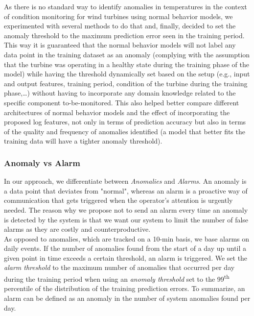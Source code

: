     \par As there is no standard way to identify anomalies in temperatures in the context of condition monitoring for wind turbines using normal behavior models, we experimented 
    with several methods to do that and, finally, decided to set the anomaly threshold to the maximum prediction error seen in the training period. This way it is 
    guaranteed that the normal behavior models will not label any data point in the training dataset as an anomaly (complying with the assumption that the turbine was operating 
    in a healthy state during the training phase of the model) while having the threshold dynamically set based on the setup (e.g., 
    input and output features, training period, condition of the turbine during the training phase,\dots) without having to incorporate any domain knowledge related to the 
    specific component to-be-monitored. This also helped better compare different architectures of normal behavior models and the effect of incorporating the proposed log features, 
    not only in terms of prediction accuracy but also in terms of the quality and frequency of anomalies identified (a model that better fits the training data will have a 
    tighter anomaly threshold).

    \subsubsection{Anomaly vs Alarm}
    \label{subsub:anvsal}
      In our approach, we differentiate between \emph{Anomalies} and \emph{Alarms}. An anomaly is a data point that deviates from "normal", whereas an alarm is a proactive 
      way of communication that gets triggered when the operator's attention is urgently needed. The reason why we propose not to send an alarm every time an anomaly is 
      detected by the system is that we want our system to limit the number of false alarms as they are costly and counterproductive.\\
      As opposed to anomalies, which are tracked on a 10-min basis, we base alarms on daily events. If the number of anomalies found from the start of a day up until a given 
      point in time exceeds a certain threshold, an alarm is triggered. We set the \emph{alarm threshold} to the maximum number of 
      anomalies that occurred per day during the training period when using an \emph{anomaly threshold} set to the 99\textsuperscript{th} percentile of the distribution of the 
      training prediction errors. To summarize, an alarm can be defined as an anomaly in the number of system anomalies found per day.\\
  
